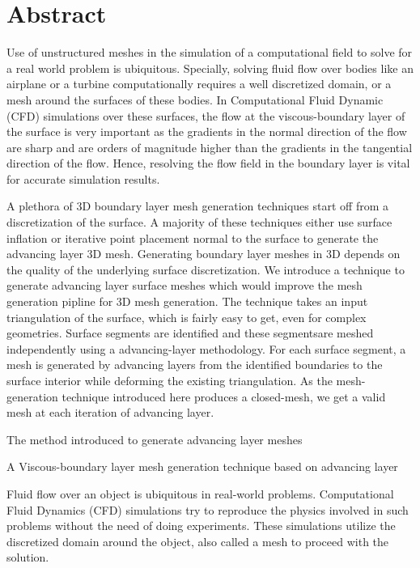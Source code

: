 
\chapter{Abstract}

Use of unstructured meshes in the simulation of a computational field to solve for a real world problem is ubiquitous. Specially, solving fluid flow over bodies like an airplane or a turbine computationally requires a well discretized domain, or a mesh around the surfaces of these bodies. In Computational Fluid Dynamic (CFD) simulations over these surfaces, the flow at the viscous-boundary layer of the surface is very important as the gradients in the normal direction of the flow are sharp and are orders of magnitude higher than the gradients in the tangential direction of the flow. Hence, resolving the flow field in the boundary layer is vital for accurate simulation results.

A plethora of 3D boundary layer mesh generation techniques start off from a discretization of the surface. A majority of these techniques either use surface inflation or iterative point placement normal to the surface to generate the advancing layer 3D mesh. Generating boundary layer meshes in 3D depends on the quality of the underlying surface discretization. We introduce a technique to generate advancing layer surface meshes which would improve the mesh generation pipline for 3D mesh generation. The technique takes an input triangulation of the surface, which is fairly easy to get, even for complex geometries. Surface segments are identified and these segmentsare meshed independently using a advancing-layer methodology. For each surface segment, a mesh is generated by advancing layers from the identified boundaries to the surface interior while deforming the existing triangulation. As the mesh-generation technique introduced here produces a closed-mesh, we get a valid mesh at each iteration of advancing layer.

The method introduced to generate advancing layer meshes 

A Viscous-boundary layer mesh generation technique based on advancing layer 

Fluid flow over an object is ubiquitous in real-world problems. Computational Fluid Dynamics (CFD) simulations try to reproduce the physics involved in such problems without the need of doing experiments. These simulations utilize the discretized domain around the object, also called a mesh to proceed with the solution. 

